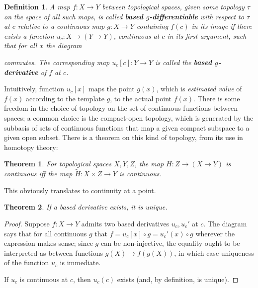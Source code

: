 \documentclass{article}
\newtheorem{thm}{Theorem}
\newtheorem*{define}{Definition}
\begin{document}
\begin{define}
  A map $f: X\to Y$ between topological spaces, given some topology $\tau$ on the space of all such maps,
  is called \textbf{based $g$-differentiable} with respect to $\tau$ at $c$ relative to a continuous map $g: X \to Y$
  containing $f(c)$ in its image if there exists a function $u_{c}: X \to (Y \to Y)$, continuous at $c$ in its first argument,
  such that for all $x$ the diagram
  \begin{center}
  \end{center}
  commutes.
  The corresponding map $u_{c}[c]: Y \to Y$ is called the \textbf{based $g$-derivative} of $f$ at $c$.
\end{define}

Intuitively, function $u_c[x]$ maps the point $g(x)$, which is \textit{estimated value} of $f(x)$ according to the template $g$, to the actual point $f(x)$.
There is some freedom in the choice of topology on the set of continuous functions between spaces; a common choice is the compact-open topology,
which is generated by the subbasis of sets of continuous functions that map a given compact subspace to a given open subset.
There is a theorem on this kind of topology, from its use in homotopy theory:
\begin{thm}
  For topological spaces $X, Y, Z$, the map $H: Z \to (X \to Y)$ is continuous iff the map $\tilde{H}: X \times Z \to Y$ is continuous.
\end{thm}
This obviously translates to continuity at a point.

\begin{thm}
  If a based derivative exists, it is unique.
\end{thm}

\begin{proof}
  Suppose $f: X \to Y$ admits two based derivatives $u_{c}, u_{c}'$ at $c$.
  The diagram says that for all continuous $g$ that $f = u_{c}[x] \circ g = u_{c}'(x) \circ g$ wherever the expression makes sense;
  since $g$ can be non-injective, the equality ought to be interpreted as between functions $g(X) \to f(g(X))$,
  in which case uniqueness of the function $u_{c}$ is immediate.

  If $u_{c}$ is continuous at $c$, then $u_{c}(c)$ exists (and, by definition, is unique).
\end{proof}
\end{document}
